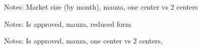 \documentclass[12pt]{article}
\begin{document}
\begin{table}[htbp!]
    \begin{center}
    \caption{}
    
    \label{tab:intiqal_marketsize_mauza_3_4}
    \end{center}
    \justifying
Notes: Market size (by month), mauza, one center vs 2 centers

\par\vspace{2.5cm}
\end{table}

\begin{table}[htbp!]
    \begin{center}
    \caption{}
    
    \label{tab:intiqal_isapproved_mauza_reduced_3_7}
    \end{center}
    \justifying
Notes: Is approved, mauza, reduced form

\par\vspace{2.5cm}
\end{table}

\begin{table}[htbp!]
    \begin{center}
    \caption{}
    
    \label{tab:intiqal_isapproved_mauza_3_7}
    \end{center}
    \justifying
Notes: Is approved, mauza, one center vs 2 centers, 

\par\vspace{2.5cm}
\end{table}
\end{document}
